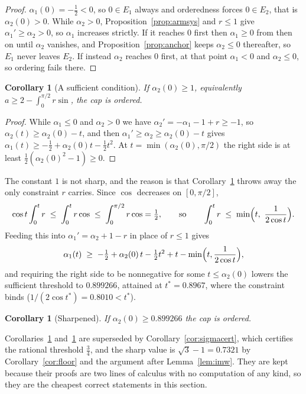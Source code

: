 \documentclass[11pt]{article}
\newtheorem{corollary}[theorem]{Corollary}
\theoremstyle{definition}
\begin{document}
\begin{proof}
$\alpha_1(0)=-\tfrac12<0$, so $0\in E_1$ always and orderedness forces $0\in E_2$, that is
$\alpha_2(0)>0$. While $\alpha_2>0$, Proposition~\ref{prop:armsys} and $r\le1$ give
$\alpha_1'\ge\alpha_2>0$, so $\alpha_1$ increases strictly. If it reaches $0$ first then
$\alpha_1\ge0$ from then on until $\alpha_2$ vanishes, and Proposition~\ref{prop:anchor}
keeps $\alpha_2\le0$ thereafter, so $E_1$ never leaves $E_2$. If instead $\alpha_2$
reaches $0$ first, at that point $\alpha_1<0$ and $\alpha_2\le0$, so ordering fails there.
\end{proof}

\begin{corollary}[A sufficient condition]\label{cor:race}
If $\alpha_2(0)\ge1$, equivalently $a\ge2-\int_0^{\pi/2}r\sin$, the cap is ordered.
\end{corollary}

\begin{proof}
While $\alpha_1\le0$ and $\alpha_2>0$ we have $\alpha_2'=-\alpha_1-1+r\ge-1$, so
$\alpha_2(t)\ge\alpha_2(0)-t$, and then $\alpha_1'\ge\alpha_2\ge\alpha_2(0)-t$ gives
$\alpha_1(t)\ge-\tfrac12+\alpha_2(0)t-\tfrac12t^2$. At $t=\min(\alpha_2(0),\pi/2)$ the
right side is at least $\tfrac12(\alpha_2(0)^2-1)\ge0$.
\end{proof}

The constant $1$ is not sharp, and the reason is that Corollary~\ref{cor:race} throws away
the only constraint $r$ carries. Since $\cos$ decreases on $[0,\pi/2]$,
\[
  \cos t\int_0^t r \;\le\; \int_0^t r\cos \;\le\; \int_0^{\pi/2} r\cos=\tfrac12 ,
  \qquad\text{so}\qquad \int_0^t r\;\le\;\min\Bigl(t,\ \frac1{2\cos t}\Bigr) .
\]
Feeding this into $\alpha_1'=\alpha_2+1-r$ in place of $r\le1$ gives
\[
  \alpha_1(t)\;\ge\;-\tfrac12+\alpha_2(0)\,t-\tfrac12t^2+t-\min\Bigl(t,\frac1{2\cos t}\Bigr) ,
\]
and requiring the right side to be nonnegative for some $t\le\alpha_2(0)$ lowers the
sufficient threshold to $0.899266$, attained at $t^*=0.8967$, where the constraint binds
($1/(2\cos t^*)=0.8010<t^*$).

\begin{corollary}[Sharpened]\label{cor:race2}
If $\alpha_2(0)\ge0.899266$ the cap is ordered.
\end{corollary}

Corollaries~\ref{cor:race} and~\ref{cor:race2} are superseded by
Corollary~\ref{cor:sigmacert}, which certifies the rational threshold $\tfrac34$, and the
sharp value is $\sqrt3-1=0.7321$ by Corollary~\ref{cor:floor} and the argument after
Lemma~\ref{lem:imw}. They are kept because their proofs are two lines of calculus with no
computation of any kind, so they are the cheapest correct statements in this section.
\end{document}
